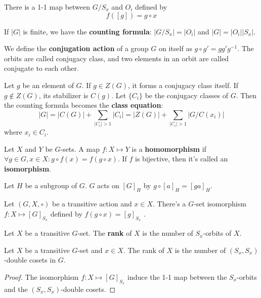 \documentclass[12pt]{book}
\begin{document}
\begin{lemma}
	There is a 1-1 map between $G/S_x$ and $O_i$ defined by
	\begin{equation}
		f([g])=g\circ x
	\end{equation}
\end{lemma}
	
\begin{corollary}
	If $|G|$ is finite, we have the \textbf{counting formula}: $|G/S_x|=|O_i|$ and $|G|=|O_i||S_x|$.
\end{corollary}


\begin{example}
	We define the {\bf conjugation action} of a group $G$ on itself as $g\circ g'=gg'g^{-1}$. The orbits are called conjugacy class, and two elements in an orbit are called conjugate to each other.

Let $g$ be an element of $G$. If $g\in Z(G)$, it forms a conjugacy class itself. If $g\not\in Z(G)$, its stabilizer is $C(g)$. Let $\{C_i\}$ be the conjugacy classes of $G$. Then the counting formula becomes the {\bf class equation}:
\begin{equation}
	|G|=|C(G)|+\sum_{|C_i|>1}|C_i|=|Z(G)|+\sum_{|C_i|>1}|G/C(x_i)|
\end{equation}
where $x_i\in C_i$.
\end{example}

\begin{definition}
	Let $X$ and $Y$ be $G$-sets. A map $f:X\mapsto Y$ is a {\bf homomorphism} if $\forall g\in G,x\in X:g\circ f(x)=f(g\circ x)$. If $f$ is bijective, then it's called an {\bf isomorphism}.
\end{definition}
	
\begin{example}
	Let $H$ be a subgroup of $G$. $G$ acts on $[G]_H$ by $g\circ[a]_H=[ga]_H$.
\end{example}
	
\begin{lemma}
	Let $(G,X,\circ)$ be a transitive action and $x\in X$. There's a $G$-set isomorphism $f:X\mapsto [G]_{S_x}$ defined by $f(g\circ x)=[g]_{S_x}$ .
\end{lemma}

\begin{definition}
	Let $X$ be a transitive $G$-set. The {\bf rank} of $X$ is the number of $S_x$-orbits of $X$.
\end{definition}

\begin{lemma}
	Let $X$ be a transitive $G$-set and $x\in X$. The rank of $X$ is the number of $(S_x,S_x)$-double cosets in $G$.
\end{lemma}
\begin{proof}
	The isomorphism $f:X\mapsto [G]_{S_x}$ induce the 1-1 map between the $S_x$-orbits and the $(S_x,S_x)$-double cosets.
\end{proof}
	
\end{document}
